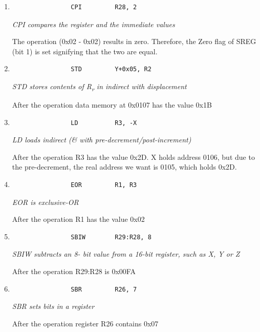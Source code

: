 \documentclass[12pt,letterpaper]{article}
\begin{document}
\begin{enumerate}
	\begin{enumerate}[i]
		\item{
			\begin{verbatim}
				CPI			R28, 2
			\end{verbatim}
			\textit{CPI compares the register and the immediate values}
			
			The operation (0x02 - 0x02) results in zero. Therefore, the Zero flag of SREG (bit 1) is set signifying that the two are equal.
		}
		\item{
			\begin{verbatim}
				STD			Y+0x05, R2
			\end{verbatim}
			\textit{STD stores contents of R\textsubscript{r} in indirect with displacement}
			
			After the operation data memory at 0x0107 has the value 0x1B
		}
		\item{
			\begin{verbatim}
				LD 			R3, -X
			\end{verbatim}
			\textit{LD loads indirect (\& with pre-decrement/post-increment)}
			
			After the operation R3 has the value 0x2D. X holds address 0106, but due to the pre-decrement, the real address we want is 0105, which holds 0x2D.
		}
		\item{
			\begin{verbatim}
				EOR 		R1, R3
			\end{verbatim}
			\textit{EOR is exclusive-OR}
			
			After the operation R1 has the value 0x02
		}
		\item{
			\begin{verbatim}
				SBIW 		R29:R28, 8
			\end{verbatim}
			\textit{SBIW subtracts an 8- bit value from a 16-bit register, such as X, Y or Z}
			
			After the operation R29:R28 is 0x00FA
		}
		\item{
			\begin{verbatim}
				SBR 		R26, 7
			\end{verbatim}
			\textit{SBR sets bits in a register}
			
			After the operation register R26 contains 0x07
		}
	\end{enumerate}
	
\end{enumerate}


       
\end{document}
